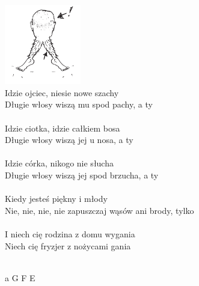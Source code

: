 \documentclass[a5paper, 10pt]{book}
\begin{document}
\begin{minipage}[t]{0.9\textwidth}
\includegraphics[height=3.5cm, right]{wlosy2.png}\vspace*{-3.6cm}\\
Idzie ojciec, niesie nowe szachy\\
Długie włosy wiszą mu spod pachy, a ty\\
\\
Idzie ciotka, idzie całkiem bosa\\
Długie włosy wiszą jej u nosa, a ty\\
\\
Idzie córka, nikogo nie słucha\\
Długie włosy wiszą jej spod brzucha, a ty\\
\\
Kiedy jesteś piękny i młody\\
Nie, nie, nie, nie zapuszczaj wąsów ani brody, tylko\\
\\
I niech cię rodzina z domu wygania\\
Niech cię fryzjer z nożycami gania\\
\\
\end{minipage}
\begin{minipage}[t]{0.1\textwidth}
a G F E\\
\end{minipage}
\newpage
\end{document}

